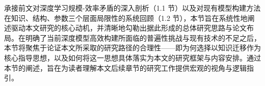 \documentclass[../main.tex]{subfiles}
\begin{document}

\label{sec:ch1-3-research-motivation-and-overview}

承接前文对深度学习规模-效率矛盾的深入剖析（1.1 节）以及对现有模型构建方法在知识、结构、参数三个层面局限性的系统回顾（1.2 节），本节旨在系统性地阐述驱动本文研究的核心动机，并清晰地勾勒出据此形成的总体研究思路与论文布局。在明确了当前深度模型高效构建所面临的普遍性挑战与现有技术的不足之后，本节将聚焦于论证本文所采取的研究路径的合理性——即为何选择以知识迁移作为核心指导思想，以及如何将这一思想具体落实为本文的研究框架与内容安排。通过本节的阐述，旨在为读者理解本文后续章节的研究工作提供宏观的视角与逻辑指引。
\end{document}
